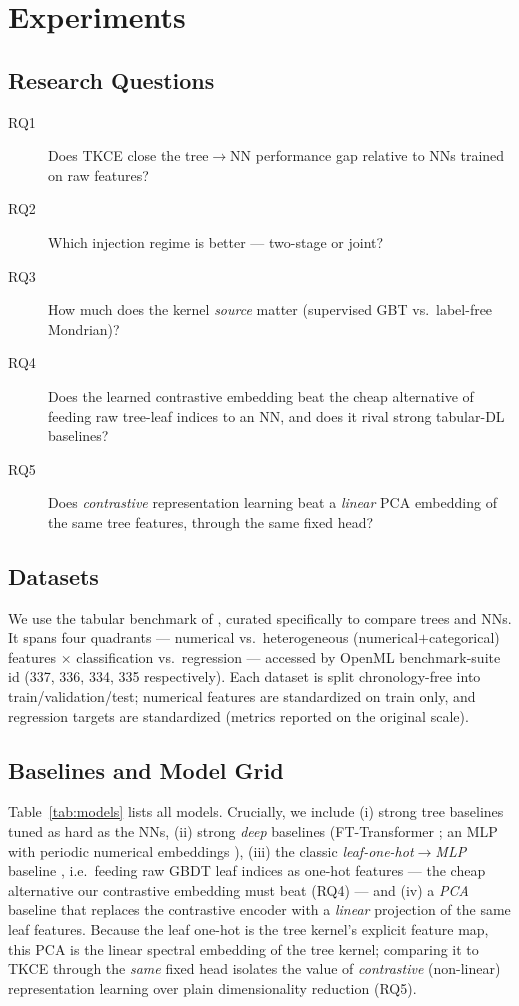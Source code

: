 \documentclass[11pt]{article}
\begin{document}
\section{Experiments}

\subsection{Research Questions}
\begin{description}
  \item[RQ1] Does TKCE close the tree$\rightarrow$NN performance gap relative to
  NNs trained on raw features?
  \item[RQ2] Which injection regime is better — two-stage or joint?
  \item[RQ3] How much does the kernel \emph{source} matter (supervised GBT vs.\
  label-free Mondrian)?
  \item[RQ4] Does the learned contrastive embedding beat the cheap alternative of
  feeding raw tree-leaf indices to an NN, and does it rival strong tabular-DL
  baselines?
  \item[RQ5] Does \emph{contrastive} representation learning beat a \emph{linear}
  PCA embedding of the same tree features, through the same fixed head?
\end{description}

\subsection{Datasets}
We use the tabular benchmark of \citet{grinsztajn2022}, curated specifically to
compare trees and NNs. It spans four quadrants --- numerical vs.\ heterogeneous
(numerical$+$categorical) features $\times$ classification vs.\ regression ---
accessed by OpenML benchmark-suite id (337, 336, 334, 335 respectively). Each
dataset is split chronology-free into train/validation/test; numerical features
are standardized on train only, and regression targets are standardized (metrics
reported on the original scale).

\subsection{Baselines and Model Grid}
Table~\ref{tab:models} lists all models. Crucially, we include (i) strong tree
baselines tuned as hard as the NNs, (ii) strong \emph{deep} baselines
(FT-Transformer \cite{gorishniy2021}; an MLP with periodic numerical embeddings
\cite{gorishniy2022}), (iii) the classic \emph{leaf-one-hot$\to$MLP}
baseline \cite{he2014}, i.e.\ feeding raw GBDT leaf indices as one-hot features
--- the cheap alternative our contrastive embedding must beat (RQ4) --- and
(iv) a \emph{PCA} baseline that replaces the contrastive encoder with a
\emph{linear} projection of the same leaf features. Because the leaf one-hot is
the tree kernel's explicit feature map, this PCA is the linear spectral embedding
of the tree kernel; comparing it to TKCE through the \emph{same} fixed head
isolates the value of \emph{contrastive} (non-linear) representation learning
over plain dimensionality reduction (RQ5).
\end{document}
